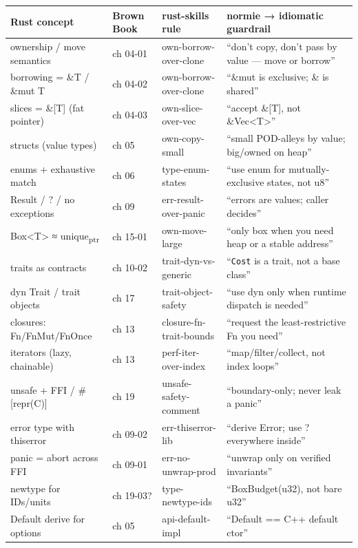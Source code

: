 \documentclass[11pt]{article}
\begin{document}
\begin{center}
\begin{tabular}{llll}
Rust concept & Brown Book & rust-skills rule & normie → idiomatic guardrail\\
\hline
ownership / move semantics & ch 04-01 & own-borrow-over-clone & ``don't copy, don't pass by value — move or borrow''\\
borrowing = \&T / \&mut T & ch 04-02 & own-borrow-over-clone & ``\&mut is exclusive; \& is shared''\\
slices = \&[T] (fat pointer) & ch 04-03 & own-slice-over-vec & ``accept \&[T], not \&Vec<T>''\\
structs (value types) & ch 05 & own-copy-small & ``small POD-alleys by value; big/owned on heap''\\
enums + exhaustive match & ch 06 & type-enum-states & ``use enum for mutually-exclusive states, not u8''\\
Result / ? / no exceptions & ch 09 & err-result-over-panic & ``errors are values; caller decides''\\
Box<T> ≈ unique\textsubscript{ptr} & ch 15-01 & own-move-large & ``only box when you need heap or a stable address''\\
traits as contracts & ch 10-02 & trait-dyn-vs-generic & ``\texttt{Cost} is a trait, not a base class''\\
dyn Trait / trait objects & ch 17 & trait-object-safety & ``use dyn only when runtime dispatch is needed''\\
closures: Fn/FnMut/FnOnce & ch 13 & closure-fn-trait-bounds & ``request the least-restrictive Fn you need''\\
iterators (lazy, chainable) & ch 13 & perf-iter-over-index & ``map/filter/collect, not index loops''\\
unsafe + FFI / \#[repr(C)] & ch 19 & unsafe-safety-comment & ``boundary-only; never leak a panic''\\
error type with thiserror & ch 09-02 & err-thiserror-lib & ``derive Error; use ? everywhere inside''\\
panic = abort across FFI & ch 09-01 & err-no-unwrap-prod & ``unwrap only on verified invariants''\\
newtype for IDs/units & ch 19-03? & type-newtype-ids & ``BoxBudget(u32), not bare u32''\\
Default derive for options & ch 05 & api-default-impl & ``Default == C++ default ctor''\\
\end{tabular}
\end{center}
\end{document}
